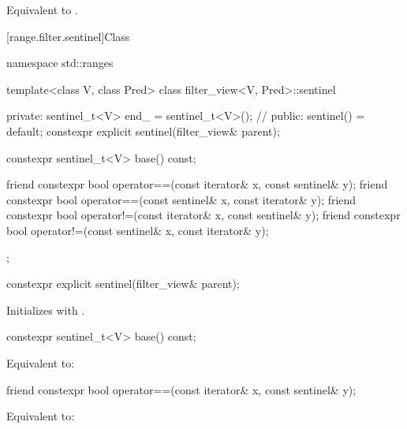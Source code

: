 \begin{itemdescr}
\pnum
\effects Equivalent to .
\end{itemdescr}

[range.filter.sentinel]{Class }

%
\begin{codeblock}
namespace std::ranges {
  template<class V, class Pred>
  class filter_view<V, Pred>::sentinel {
  private:
    sentinel_t<V> end_ = sentinel_t<V>();       // \expos
  public:
    sentinel() = default;
    constexpr explicit sentinel(filter_view& parent);

    constexpr sentinel_t<V> base() const;

    friend constexpr bool operator==(const iterator& x, const sentinel& y);
    friend constexpr bool operator==(const sentinel& x, const iterator& y);
    friend constexpr bool operator!=(const iterator& x, const sentinel& y);
    friend constexpr bool operator!=(const sentinel& x, const iterator& y);
  };
}
\end{codeblock}

%
\begin{itemdecl}
constexpr explicit sentinel(filter_view& parent);
\end{itemdecl}

\begin{itemdescr}
\pnum
\effects Initializes  with .
\end{itemdescr}

%
\begin{itemdecl}
constexpr sentinel_t<V> base() const;
\end{itemdecl}

\begin{itemdescr}
\pnum
\effects Equivalent to: 
\end{itemdescr}

%
\begin{itemdecl}
friend constexpr bool operator==(const iterator& x, const sentinel& y);
\end{itemdecl}

\begin{itemdescr}
\pnum
\effects Equivalent to: 
\end{itemdescr}


